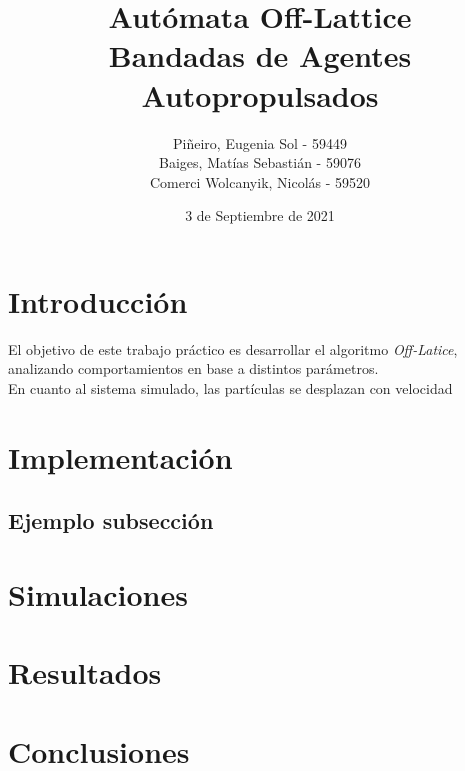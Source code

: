 \documentclass[12pt, a4paper]{report}
\title{%
Autómata Off-Lattice \\
\large Bandadas de Agentes Autopropulsados
}
\author{Piñeiro, Eugenia Sol - 59449\\
Baiges, Matías Sebastián - 59076\\
Comerci Wolcanyik, Nicolás - 59520
}
\date{3 de Septiembre de 2021}
\begin{document}
\maketitle

\tableofcontents
\newpage

\section{Introducción}
El objetivo de este trabajo práctico es desarrollar el algoritmo \emph{Off-Latice}, 
analizando comportamientos en base a distintos parámetros. \\

En cuanto al sistema simulado, las partículas se desplazan con velocidad

\section{Implementación}
    \subsection{Ejemplo subsección}

\section{Simulaciones}

\section{Resultados}

\section{Conclusiones}
\end{document}
